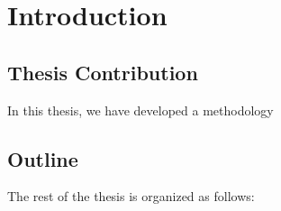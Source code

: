 


\chapter{Introduction}\label{chap1:Introduction}




\section{Thesis Contribution}\label{chap1:Introdaction:Thesis Contribution}
In this thesis, we have developed a methodology 


\section{Outline}\label{chap1:Introdaction:Outline}
The rest of the thesis is organized as follows: 